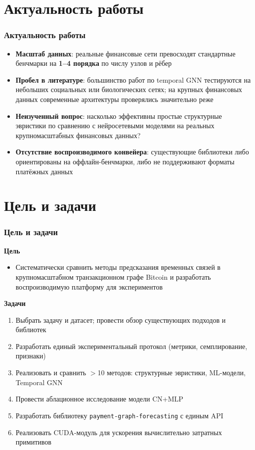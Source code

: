 \documentclass[aspectratio=169]{beamer}
\begin{document}
\section{Актуальность работы}
\begin{frame}[fragile]
  \frametitle{Актуальность работы}
  \begin{itemize}
    \item \textbf{Масштаб данных}: реальные финансовые сети превосходят стандартные бенчмарки на \textbf{1–4 порядка} по числу узлов и рёбер
    \item \textbf{Пробел в литературе}: большинство работ по temporal GNN тестируются на небольших социальных или биологических сетях; на крупных финансовых данных современные архитектуры проверялись значительно реже
    \item \textbf{Неизученный вопрос}: насколько эффективны простые структурные эвристики по сравнению с нейросетевыми моделями на реальных крупномасштабных финансовых данных?
    \item \textbf{Отсутствие воспроизводимого конвейера}: существующие библиотеки либо ориентированы на оффлайн-бенчмарки, либо не поддерживают форматы платёжных данных
  \end{itemize}
\end{frame}

\section{Цель и задачи}
\begin{frame}
  \frametitle{Цель и задачи}
  \textbf{Цель}
  \begin{itemize}
    \item Систематически сравнить методы предсказания временных связей в крупномасштабном транзакционном графе Bitcoin и разработать воспроизводимую платформу для экспериментов
  \end{itemize}
  \vspace{0.3cm}
  \textbf{Задачи}
  \begin{enumerate}
    \item Выбрать задачу и датасет; провести обзор существующих подходов и библиотек
    \item Разработать единый экспериментальный протокол (метрики, семплирование, признаки)
    \item Реализовать и сравнить $>$10 методов: структурные эвристики, ML-модели, Temporal GNN
    \item Провести аблационное исследование модели CN+MLP
    \item Разработать библиотеку \texttt{payment-graph-forecasting} с единым API
    \item Реализовать CUDA-модуль для ускорения вычислительно затратных примитивов
  \end{enumerate}
\end{frame}
\end{document}
